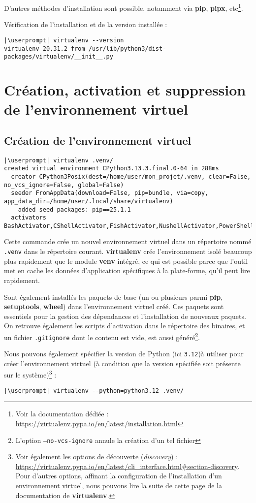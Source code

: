 D'autres méthodes d'installation sont possible, notamment via \textbf{pip}, \textbf{pipx}, etc\footnote{Voir la documentation dédiée : \url{https://virtualenv.pypa.io/en/latest/installation.html}}.

Vérification de l'installation et de la version installée :
\begin{lstlisting}[style=bash]
|\userprompt| virtualenv --version
virtualenv 20.31.2 from /usr/lib/python3/dist-packages/virtualenv/__init__.py
\end{lstlisting}

\section{Création, activation et suppression de l'environnement virtuel}
\subsection*{Création de l'environnement virtuel}
\begin{lstlisting}[style=bash]
|\userprompt| virtualenv .venv/  
created virtual environment CPython3.13.3.final.0-64 in 288ms
  creator CPython3Posix(dest=/home/user/mon_projet/.venv, clear=False, no_vcs_ignore=False, global=False)
  seeder FromAppData(download=False, pip=bundle, via=copy, app_data_dir=/home/user/.local/share/virtualenv)
    added seed packages: pip==25.1.1
  activators BashActivator,CShellActivator,FishActivator,NushellActivator,PowerShellActivator,PythonActivator
\end{lstlisting}

Cette commande crée un nouvel environnement virtuel dans un répertoire nommé \texttt{.venv} dans le répertoire courant. \textbf{virtualenv} crée l'environnement isolé beaucoup plus rapidement que le module \textbf{venv} intégré, ce qui est possible parce que l'outil met en cache les données d'application spécifiques à la plate-forme, qu'il peut lire rapidement.

Sont également installés les paquets de base (un ou plusieurs parmi \textbf{pip}, \textbf{setuptools}, \textbf{wheel}) dans l'environnement virtuel créé. Ces paquets sont essentiels pour la gestion des dépendances et l'installation de nouveaux paquets. On retrouve également les scripts d'activation dans le répertoire des binaires, et un fichier \texttt{.gitignore} dont le contenu est vide, est aussi généré\footnote{L'option \texttt{--no-vcs-ignore} annule la création d'un tel fichier}.

Nous pouvons également spécifier la version de Python (ici \texttt{3.12})à utiliser pour créer l'environnement virtuel (à condition que la version spécifiée soit présente sur le système)\footnote{Voir également les options de découverte (\textit{discovery}) : \url{https://virtualenv.pypa.io/en/latest/cli_interface.html\#section-discovery}. Pour d'autres options, affinant la configuration de l'installation d'un environnement virtuel, nous pouvons lire la suite de cette page de la documentation de \textbf{virtualenv}.} :
\begin{lstlisting}[style=bash]
|\userprompt| virtualenv --python=python3.12 .venv/
\end{lstlisting}

